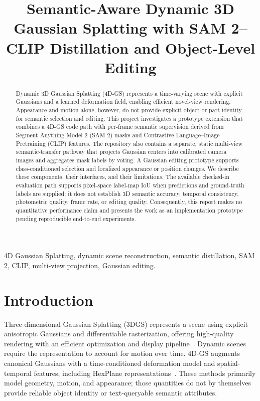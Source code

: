 \documentclass[conference]{IEEEtran}
\title{Semantic-Aware Dynamic 3D Gaussian Splatting with SAM 2--CLIP Distillation and Object-Level Editing}
\author{\IEEEauthorblockN{Uthkarsh Sai, Akhil Reddy, Tenisha Akhila, Jagapathi Naidu, and Jeevita Bhupati}
\IEEEauthorblockA{Group 08, Computer Vision Course Project\\Amrita Vishwa Vidyapeetham, India}}
\begin{document}
\maketitle

\begin{abstract}
Dynamic 3D Gaussian Splatting (4D-GS) represents a time-varying scene with explicit Gaussians and a learned deformation field, enabling efficient novel-view rendering. Appearance and motion alone, however, do not provide explicit object or part identity for semantic selection and editing. This project investigates a prototype extension that combines a 4D-GS code path with per-frame semantic supervision derived from Segment Anything Model 2 (SAM 2) masks and Contrastive Language--Image Pretraining (CLIP) features. The repository also contains a separate, static multi-view semantic-transfer pathway that projects Gaussian centers into calibrated camera images and aggregates mask labels by voting. A Gaussian editing prototype supports class-conditioned selection and localized appearance or position changes. We describe these components, their interfaces, and their limitations. The available checked-in evaluation path supports pixel-space label-map IoU when predictions and ground-truth labels are supplied; it does not establish 3D semantic accuracy, temporal consistency, photometric quality, frame rate, or editing quality. Consequently, this report makes no quantitative performance claim and presents the work as an implementation prototype pending reproducible end-to-end experiments.
\end{abstract}

\begin{IEEEkeywords}
4D Gaussian Splatting, dynamic scene reconstruction, semantic distillation, SAM 2, CLIP, multi-view projection, Gaussian editing.
\end{IEEEkeywords}

\section{Introduction}
Three-dimensional Gaussian Splatting (3DGS) represents a scene using explicit anisotropic Gaussians and differentiable rasterization, offering high-quality rendering with an efficient optimization and display pipeline~\cite{kerbl2023gs}. Dynamic scenes require the representation to account for motion over time. 4D-GS augments canonical Gaussians with a time-conditioned deformation model and spatial-temporal features, including HexPlane representations~\cite{wu20244dgs,wang2023hexplane}. These methods primarily model geometry, motion, and appearance; those quantities do not by themselves provide reliable object identity or text-queryable semantic attributes.
\end{document}
